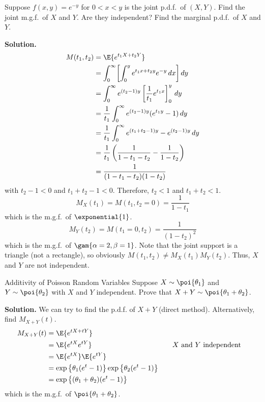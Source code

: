 \begin{Example}{}{}
    Suppose $ f(x,y)=e^{-y} $ for $ 0<x<y $ is the joint p.d.f.\
    of $ (X,Y) $. Find the joint m.g.f.\ of $ X $ and $ Y $.
    Are they independent? Find the marginal p.d.f.\ of $ X $ and $ Y $.

    \textbf{Solution.}
    \begin{align*}
        M(t_1,t_2)
         & =\E{e^{t_1X+t_2Y}}                                                  \\
         & =\int_{0}^{\infty}
        \biggl[\int_{0}^{y} e^{t_1 x+ t_2 y}e^{-y}\, d{x} \biggr]\, d{y}       \\
         & =\int_{0}^{\infty} e^{(t_2-1)y}
        \left[ \frac{1}{t_1} e^{t_1 x} \right]_0^y \, d{y}                     \\
         & =\frac{1}{t_1} \int_{0}^{\infty} e^{(t_2-1)y}(e^{t_1 y}-1)\, d{y}   \\
         & =\frac{1}{t_1} \int_{0}^{\infty}
        e^{(t_1+t_2-1)y}-e^{(t_2-1)y}\, d{y}                                   \\
         & =\frac{1}{t_1} \left( \frac{1}{1-t_1-t_2} -\frac{1}{1-t_2}  \right) \\
         & =\frac{1}{(1-t_1-t_2)(1-t_2)}
    \end{align*}
    with $ t_2-1<0 $ and $ t_1+t_2-1<0 $. Therefore,
    $ t_2<1 $ and $ t_1+t_2<1 $.
    \[ M_X(t_1)=M(t_1,t_2=0)=\frac{1}{1-t_1} \]
    which is the m.g.f.\ of $ \exponential{1} $.
    \[ M_Y(t_2)=M(t_1=0,t_2)=\frac{1}{(1-t_2)^2} \]
    which is the m.g.f.\ of $ \gam{\alpha=2,\beta=1} $.
    Note that the joint support is a triangle (not a rectangle),
    so obviously $ M(t_1,t_2)\neq M_X(t_1)M_Y(t_2) $. Thus,
    $ X $ and $ Y $ are not independent.
\end{Example}
\begin{Example}{Additivity of Poisson Random Variables}{}
    Suppose $ X \sim \poi{\theta_1} $ and $ Y \sim \poi{\theta_2} $
    with $ X $ and $ Y $ independent. Prove
    that $ X+Y \sim \poi{\theta_1+\theta_2} $.

    \textbf{Solution.} We can try to find the p.d.f. of $ X+Y $
    (direct method). Alternatively, find $ M_{X+Y}(t) $.
    \begin{align*}
        M_{X+Y}(t)
         & =\E{e^{tX+tY}}                                                                                                   \\
         & =\E{e^{tX}e^{tY}}                                                       & \quad & \text{$X$ and $Y$ independent} \\
         & =\E{e^{tX}}\E{e^{tY}}                                                                                            \\
         & =\exp\left\{ \theta_1(e^t-1)\right\}\exp\left\{ \theta_2(e^t-1)\right\}                                          \\
         & =\exp\left\{ (\theta_1+\theta_2)(e^t-1)\right\}
    \end{align*}
    which is the m.g.f.\ of $ \poi{\theta_1+\theta_2} $.
\end{Example}

